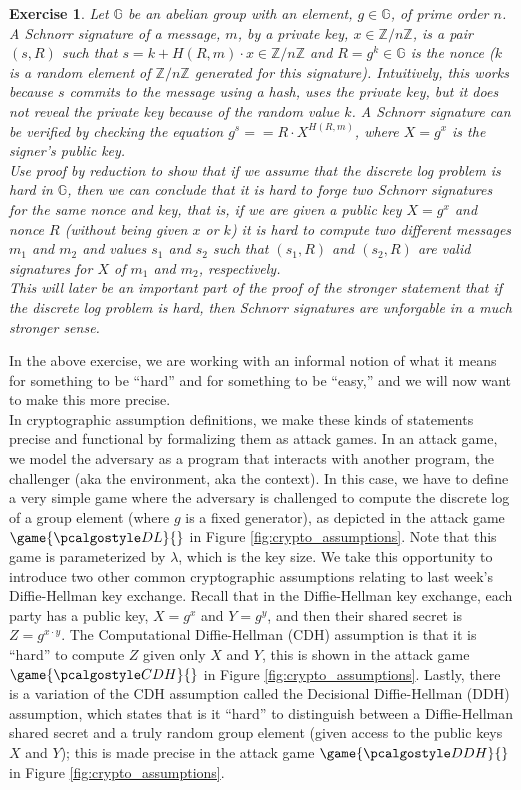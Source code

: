 \documentclass[12pt]{article}
\newcommand{\Z}[0]{\mathbb{Z}}
\newcommand{\G}[0]{\mathbb{G}}
\newtheorem{exercise}{Exercise}
\theoremstyle{definition}
\theoremstyle{remark}
\theoremstyle{definition}
\begin{document}
\begin{exercise}\label{ex:nonce-reuse}
Let $\G$ be an abelian group with an element, $g\in\G$, of prime order $n$. A Schnorr signature of a message, $m$, by a private key, $x\in\Z/n\Z$, is a pair $(s, R)$ such that $s = k + H(R, m)\cdot x\in \Z/n\Z$ and $R = g^k\in\G$ is the nonce ($k$ is a random element of $\Z/n\Z$ generated for this signature). Intuitively, this works because $s$ commits to the message using a hash, uses the private key, but it does not reveal the private key because of the random value $k$. A Schnorr signature can be verified by checking the equation $g^s == R\cdot X^{H(R, m)}$, where $X = g^x$ is the signer's public key.\\
Use proof by reduction to show that if we assume that the discrete log problem is hard in $\G$, then we can conclude that it is hard to forge two Schnorr signatures for the same nonce and key, that is, if we are given a public key $X = g^x$ and nonce $R$ (without being given $x$ or $k$) it is hard to compute two different messages $m_1$ and $m_2$ and values $s_1$ and $s_2$ such that $(s_1, R)$ and $(s_2, R)$ are valid signatures for $X$ of $m_1$ and $m_2$, respectively.\\
This will later be an important part of the proof of the stronger statement that if the discrete log problem is hard, then Schnorr signatures are unforgable in a much stronger sense.
\end{exercise}

In the above exercise, we are working with an informal notion of what it means for something to be ``hard'' and for something to be ``easy,'' and we will now want to make this more precise.\\

In cryptographic assumption definitions, we make these kinds of statements precise and functional by formalizing them as attack games. In an attack game, we model the adversary as a program that interacts with another program, the challenger (aka the environment, aka the context). In this case, we have to define a very simple game where the adversary is challenged to compute the discrete log of a group element (where $g$ is a fixed generator), as depicted in the attack game $\game{\algo{DL}}{}$ in Figure \ref{fig:crypto_assumptions}. Note that this game is parameterized by $\lambda$, which is the key size. We take this opportunity to introduce two other common cryptographic assumptions relating to last week's Diffie-Hellman key exchange. Recall that in the Diffie-Hellman key exchange, each party has a public key, $X = g^x$ and $Y = g^y$, and then their shared secret is $Z = g^{x\cdot y}$. The Computational Diffie-Hellman (CDH) assumption is that it is ``hard'' to compute $Z$ given only $X$ and $Y$, this is shown in the attack game $\game{\algo{CDH}}{}$ in Figure \ref{fig:crypto_assumptions}. Lastly, there is a variation of the CDH assumption called the Decisional Diffie-Hellman (DDH) assumption, which states that is it ``hard'' to distinguish between a Diffie-Hellman shared secret and a truly random group element (given access to the public keys $X$ and $Y$); this is made precise in the attack game $\game{\algo{DDH}}{}$ in Figure \ref{fig:crypto_assumptions}.
\end{document}

